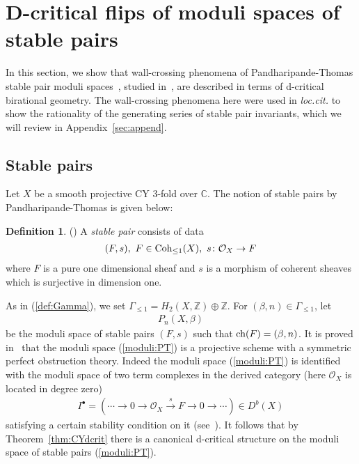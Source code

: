 \documentclass[11pt]{amsart}
\theoremstyle{plain}
\theoremstyle{definition}
\newtheorem{defi}[thm]{Definition}
\theoremstyle{remark}
\newcommand{\oO}{\mathcal{O}}
\newcommand{\ch}{\mathop{\rm ch}\nolimits}
\newcommand{\Coh}{\mathop{\rm Coh}\nolimits}
\begin{document}
\section{D-critical flips of moduli spaces of stable pairs}\label{sec:wc:mmp}
In this section, we show that wall-crossing phenomena of 
Pandharipande-Thomas stable pair moduli spaces~\cite{PT}, 
studied in~\cite{BrH, Tolim, Tolim2, Tsurvey, MR2888981}, 
are described in terms of d-critical birational geometry. 
The wall-crossing phenomena here were used in \textit{loc.cit.}
to show the rationality of the generating series of 
stable pair invariants, which we will review in Appendix~\ref{sec:append}. 
\subsection{Stable pairs}
Let $X$ be a smooth projective CY 3-fold over $\mathbb{C}$. 
The notion of stable pairs by Pandharipande-Thomas is given below: 
\begin{defi}(\cite{PT})
A \textit{stable pair} 
consists of data
\begin{align*}
(F, s), \ F \in \Coh_{\le 1}(X), \ s \colon \oO_X \to F
\end{align*}
where $F$ is a pure one dimensional sheaf and $s$ is a morphism of 
coherent sheaves which is surjective in dimension one. 
\end{defi}
As in (\ref{def:Gamma}), 
we set $\Gamma_{\le 1}=H_2(X, \mathbb{Z}) \oplus \mathbb{Z}$. 
For $(\beta, n) \in \Gamma_{\le 1}$, 
let 
\begin{align}\label{moduli:PT}
P_n(X, \beta)
\end{align}
 be the moduli space of 
stable pairs $(F, s)$ 
such that $\ch(F)=(\beta, n)$. 
It is proved in~\cite{PT, HT2} 
that the moduli space (\ref{moduli:PT}) is a projective scheme 
with a symmetric perfect obstruction theory. 
Indeed the moduli space (\ref{moduli:PT}) is 
identified with the moduli space of two term complexes 
in the derived category (here $\oO_X$ is located in degree zero)
\begin{align}\label{twoterm}
I^{\bullet}=
(\cdots \to 0 \to\oO_X \stackrel{s}{\to} F \to 0 \to \cdots) \in D^b(X) 
\end{align}
satisfying a certain stability condition on it (see~\cite{PT, Tcurve1}). 
It follows that by Theorem~\ref{thm:CYdcrit}
there is a canonical d-critical structure 
on the moduli space of stable pairs (\ref{moduli:PT}). 
\end{document}
